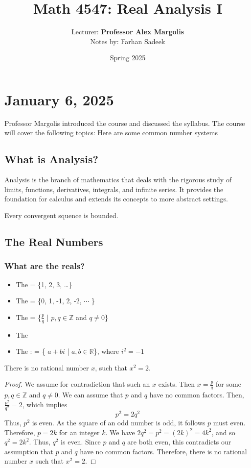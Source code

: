 \documentclass[11pt]{article}
\title{Math 4547: Real Analysis I}
\author{Lecturer: \textbf{Professor Alex Margolis}\\Notes by: Farhan Sadeek}
\date{Spring 2025}
\begin{document}
\maketitle
\section{January 6, 2025}
Professor Margolis introduced the course and discussed the syllabus. The course
will cover the following topics: Here are some common number systems
\subsection{What is Analysis?}
Analysis is the branch of mathematics that deals with the rigorous study of
limits, functions, derivatives, integrals, and infinite series. It provides the
foundation for calculus and extends its concepts to more abstract settings.

\begin{theorem}
    Every convergent squence is bounded.
\end{theorem}
\subsection{The Real Numbers}
\subsubsection{What are the reals?}

\begin{itemize}
    \item The  = \{1, 2, 3, \ldots\}
    \item The  = \{0, 1, -1, 2, -2, $\cdots$ \}
    \item The  = \{$\frac{p}{q}$ | $p,q \in
              \mathbb{Z}$ and $q \neq 0$\}
    \item The 
    \item The : = \{ $a + bi$ | $a,b \in
              \mathbb{R}$\}, where $i^2 = -1$
\end{itemize}

\begin{theorem}
    There is no rational number $x$, such that $x^2 = 2$.
\end{theorem}

\begin{proof}
    We assume for contradiction that such an $x$ exists. Then $x = \frac{p}{q}$ for some $p, q \in \mathbb{Z}$ and $q \neq 0$. We can assume that $p$ and $q$ have no common factors. Then, $\frac{p^2}{q^2} = 2$, which implies \[p^2 = 2q^2\] Thus, $p^2$ is even. As the square of an odd number is odd, it follows $p$ must
    even. Therefore, $p = 2k$ for an integer $k$. We have $2q^2 = p^2 = {(2k)}^2 =
        4k^2$, and so $q^2 = 2k^2$. Thus, $q^2$ is even. Since $p$ and $q$ are both
    even, this contradicts our assumption that $p$ and $q$ have no common factors.
    Therefore, there is no rational number $x$ such that $x^2 = 2$.
\end{proof}
\end{document}
